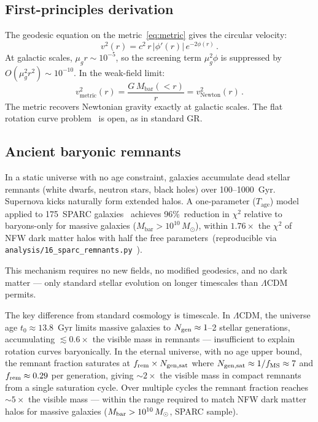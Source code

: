 \documentclass[aps,prd,twocolumn,superscriptaddress,nofootinbib,longbibliography]{revtex4-2}
\begin{document}
\subsection{First-principles derivation}

The geodesic equation on the metric~\eqref{eq:metric} gives the
circular velocity:
\begin{equation}\label{eq:vcirc}
  v^2(r) = c^2\,r\,|\phi'(r)|\,e^{-2\phi(r)}\,.
\end{equation}
At galactic scales, $\mu_g r \sim 10^{-5}$, so the screening term
$\mu_g^2\phi$ is suppressed by $O(\mu_g^2 r^2) \sim 10^{-10}$.  In
the weak-field limit:
\begin{equation}\label{eq:newt}
  v^2_{\mathrm{metric}}(r) = \frac{G\,M_{\mathrm{bar}}(<r)}{r}
  = v^2_{\mathrm{Newton}}(r)\,.
\end{equation}
The metric recovers Newtonian gravity exactly at galactic scales.
The flat rotation curve problem~\cite{Rubin1980,Milgrom1983} is open, as in standard GR.

\subsection{Ancient baryonic remnants}

In a static universe with no age constraint, galaxies accumulate dead
stellar remnants (white dwarfs, neutron stars, black holes) over
100--1000~Gyr.  Supernova kicks naturally form extended halos.  A
one-parameter ($T_{\mathrm{age}}$) model applied to 175~SPARC
galaxies~\cite{SPARC2016} achieves 96\%~reduction in $\chi^2$
relative to baryons-only for massive galaxies
($M_{\mathrm{bar}} > 10^{10}\,M_\odot$), within $1.76\times$ the
$\chi^2$ of NFW dark matter halos with half the free
parameters~(reproducible via
\texttt{analysis/16\_sparc\_remnants.py}~\cite{zenodo2025}).

This mechanism requires no new fields, no modified geodesics, and no
dark matter --- only standard stellar evolution on longer timescales
than $\Lambda$CDM permits.

The key difference from standard cosmology is timescale.  In
$\Lambda$CDM, the universe age $t_0 \approx 13.8$~Gyr limits massive
galaxies to $N_{\rm gen} \approx 1$--2 stellar generations,
accumulating $\lesssim 0.6\times$ the visible mass in remnants ---
insufficient to explain rotation curves baryonically.  In the eternal
universe, with no age upper bound, the remnant fraction saturates at
$f_{\rm rem} \times N_{\rm gen,sat}$ where
$N_{\rm gen,sat} \approx 1/f_{\rm MS} \approx 7$ and
$f_{\rm rem} \approx 0.29$ per generation, giving $\sim 2\times$ the
visible mass in compact remnants from a single saturation cycle.  Over
multiple cycles the remnant fraction reaches $\sim 5\times$ the
visible mass --- within the range required to match NFW dark matter
halos for massive galaxies ($M_{\rm bar} > 10^{10}\,M_\odot$, SPARC
sample).
\end{document}
